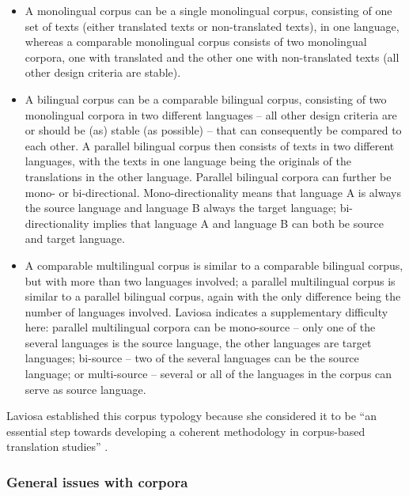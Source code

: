 \begin{itemize}
\item 
A monolingual corpus can be a single monolingual corpus, consisting of one set of texts (either translated texts or non-translated texts), in one language, whereas a comparable monolingual corpus consists of two monolingual corpora, one with translated and the other one with non-translated texts (all other design criteria are stable).
\item 
A bilingual corpus can be a comparable bilingual corpus, consisting of two monolingual corpora in two different languages – all other design criteria are or should be (as) stable (as possible) – that can consequently be compared to each other. A parallel bilingual corpus then consists of texts in two different languages, with the texts in one language being the originals of the translations in the other language. Parallel bilingual corpora can further be mono- or bi-directional. Mono-directionality means that language A is always the source language and language B always the target language; bi-directionality implies that language A and language B can both be source and target language.
\item 
A comparable multilingual corpus is similar to a comparable bilingual corpus, but with more than two languages involved; a parallel multilingual corpus is similar to a parallel bilingual corpus, again with the only difference being the number of languages involved. Laviosa indicates a supplementary difficulty here: parallel multilingual corpora can be mono-source – only one of the several languages is the source language, the other languages are target languages; bi-source – two of the several languages can be the source language; or multi-source – several or all of the languages in the corpus can serve as source language.
\end{itemize}

Laviosa established this corpus typology because she considered it to be “an essential step towards developing a coherent methodology in corpus-based translation studies” \citep[38]{laviosa_corpus-based_2002}.


\subsubsection{\label{sec:2.2.1.4}  General issues with corpora}

